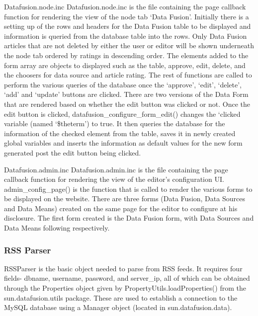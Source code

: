 \documentclass[10pt]{article} %
\begin{document}
Datafusion.node.inc
Datafusion.node.inc is the file containing the page callback function for rendering the view of the node tab ‘Data Fusion’. Initially there is a setting up of the rows and headers for the Data Fusion table to be displayed and information is queried from the database table into the rows. Only Data  Fusion articles that are not deleted by either the user or editor will be shown underneath the node tab ordered by ratings in descending order. The elements added to the form array are objects to displayed such as the table, approve, edit, delete, and the choosers for data source and article rating. The rest of functions are called to perform the various queries of the database once the ‘approve’, ‘edit’, ‘delete’, ‘add’ and ‘update’ buttons are clicked. There are two versions of the Data Form that are rendered based on whether the edit button was clicked or not. Once the edit button is clicked, datafusion\_configure\_form\_edit() changes the ‘clicked variable (named ‘\$theterm’) to true. It then queries the database for the information of the checked element from the table, saves it in newly created global variables and inserts the information as default values for the new form generated post the edit button being clicked.

Datafusion.admin.inc
Datafusion.admin.inc is the file containing the page callback function for rendering the view of the editor’s configuration UI. admin\_config\_page() is the function that is called to render the various forms to be displayed on the website. There are three forms (Data Fusion, Data Sources and Data Means) created on the same page for the editor to configure at his disclosure. The first form created is the Data Fusion form, with Data Sources and Data Means following respectively.

\subsubsection{RSS Parser}

RSSParser is the basic object needed to parse from RSS feeds. It requires four fields- dbname, username, password, and server\_ip, all of which can be obtained through the Properties object given by PropertyUtils.loadProperties() from the sun.datafusion.utils package. These are used to establish a connection to the MySQL database using a Manager object (located in sun.datafusion.data).
\end{document}
